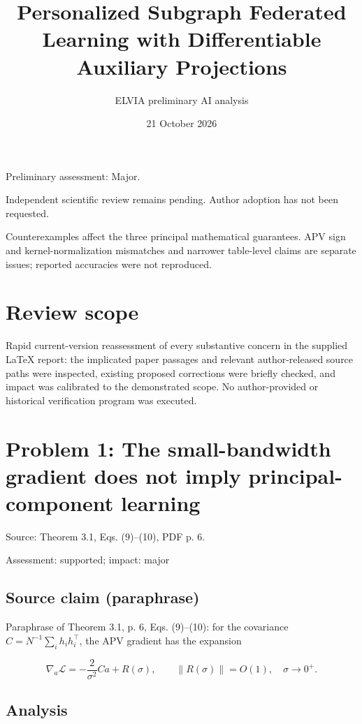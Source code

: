 \documentclass[11pt]{article}
\begin{document}
\title{Personalized Subgraph Federated Learning with Differentiable Auxiliary Projections}

\author{ELVIA preliminary AI analysis}\date{21 October 2026}\maketitle

Preliminary assessment: Major.\par

Independent scientific review remains pending. Author adoption has not been requested.

Counterexamples affect the three principal mathematical guarantees. APV sign and kernel-normalization mismatches and narrower table-level claims are separate issues; reported accuracies were not reproduced.

\section*{Review scope}

Rapid current-version reassessment of every substantive concern in the supplied LaTeX report: the implicated paper passages and relevant author-released source paths were inspected, existing proposed corrections were briefly checked, and impact was calibrated to the demonstrated scope. No author-provided or historical verification program was executed.

\section*{Problem 1: The small-bandwidth gradient does not imply principal-component learning}

Source: Theorem 3.1, Eqs. (9)–(10), PDF p. 6.

Assessment: supported; impact: major

\subsection*{Source claim (paraphrase)}

Paraphrase of Theorem 3.1, p. 6, Eqs. (9)–(10): for the covariance \(C=N^{-1}\sum_i h_i h_i^\top\), the APV gradient has the expansion

\[ \nabla_a\mathcal L=-\frac{2}{\sigma^2}Ca+R(\sigma), \qquad \|R(\sigma)\|=O(1),\quad \sigma\to0^+. \]

\subsection*{Analysis}
\end{document}
